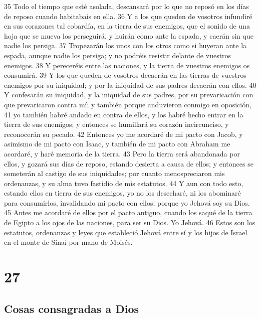 35 Todo el tiempo que esté asolada, descansará por lo que no reposó en los días de reposo cuando habitabais en ella.
36 Y a los que queden de vosotros infundiré en sus corazones tal cobardía, en la tierra de sus enemigos, que el sonido de una hoja que se mueva los perseguirá, y huirán como ante la espada, y caerán sin que nadie los persiga.
37 Tropezarán los unos con los otros como si huyeran ante la espada, aunque nadie los persiga; y no podréis resistir delante de vuestros enemigos.
38 Y pereceréis entre las naciones, y la tierra de vuestros enemigos os consumirá.
39 Y los que queden de vosotros decaerán en las tierras de vuestros enemigos por su iniquidad; y por la iniquidad de sus padres decaerán con ellos.
40 Y confesarán su iniquidad, y la iniquidad de sus padres, por su prevaricación con que prevaricaron contra mí; y también porque anduvieron conmigo en oposición,
41 yo también habré andado en contra de ellos, y los habré hecho entrar en la tierra de sus enemigos; y entonces se humillará su corazón incircunciso, y reconocerán su pecado.
42 Entonces yo me acordaré de mi pacto con Jacob, y asimismo de mi pacto con Isaac, y también de mi pacto con Abraham me acordaré, y haré memoria de la tierra.
43 Pero la tierra será abandonada por ellos, y gozará sus días de reposo, estando desierta a causa de ellos; y entonces se someterán al castigo de sus iniquidades; por cuanto menospreciaron mis ordenanzas, y su alma tuvo fastidio de mis estatutos.
44 Y aun con todo esto, estando ellos en tierra de sus enemigos, yo no los desecharé, ni los abominaré para consumirlos, invalidando mi pacto con ellos; porque yo Jehová soy su Dios.
45 Antes me acordaré de ellos por el pacto antiguo, cuando los saqué de la tierra de Egipto a los ojos de las naciones, para ser su Dios. Yo Jehová.
46 Estos son los estatutos, ordenanzas y leyes que estableció Jehová entre sí y los hijos de Israel en el monte de Sinaí por mano de Moisés.  

\chapter{27}

\section{Cosas consagradas a Dios}

